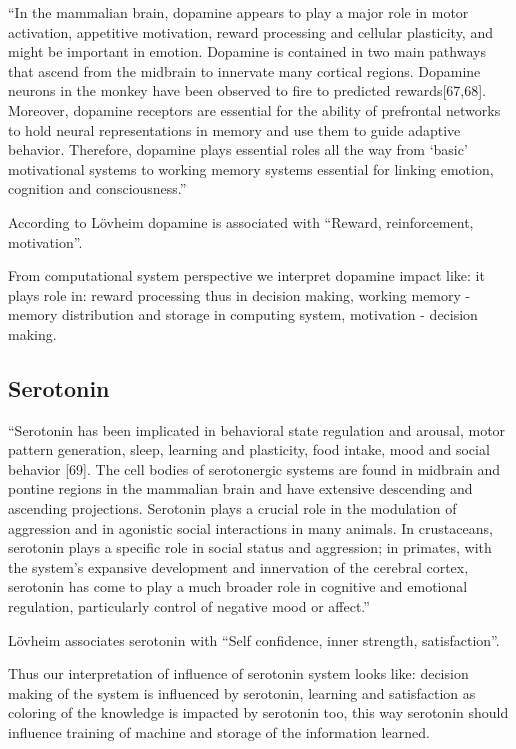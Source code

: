 ``In the mammalian brain, dopamine appears to play a major role in motor activation, appetitive motivation, reward processing and cellular plasticity, and might be important in emotion. Dopamine is contained in two main pathways that ascend from the midbrain to innervate many cortical regions. Dopamine neurons in the monkey have been observed to fire to predicted rewards[67,68]. Moreover, dopamine receptors are essential for the ability of prefrontal networks to hold neural representations in memory and use them to guide adaptive behavior. Therefore, dopamine plays essential roles all the way from ‘basic’ motivational systems to working memory systems essential for linking emotion, cognition and consciousness.''

According to L\"{o}vheim \cite{cubeofemotions} dopamine is associated with ``Reward, reinforcement, motivation''.

From computational system perspective we interpret dopamine impact like: it plays role in: reward processing thus in decision making, working memory - memory distribution and storage in computing system, motivation - decision making.

\subsection{Serotonin}

``Serotonin has been implicated in behavioral state regulation and arousal, motor pattern generation, sleep, learning and plasticity, food intake, mood and social behavior [69]. The cell bodies of serotonergic systems are found in midbrain and pontine regions in the mammalian brain and have extensive descending and ascending projections. Serotonin plays a crucial role in the modulation of aggression and in agonistic social interactions in many animals. In crustaceans, serotonin plays a specific role in social status and aggression; in primates, with the system’s expansive development and innervation of the cerebral cortex, serotonin has come to play a much broader role in cognitive and emotional regulation, particularly control of negative mood or affect.''

L\"{o}vheim associates serotonin with ``Self confidence, inner strength, satisfaction''.

Thus our interpretation of influence of serotonin system looks like: decision making of the system is influenced by serotonin, learning and satisfaction as coloring of the knowledge is impacted by serotonin too, this way serotonin should influence training of machine and storage of the information learned.

